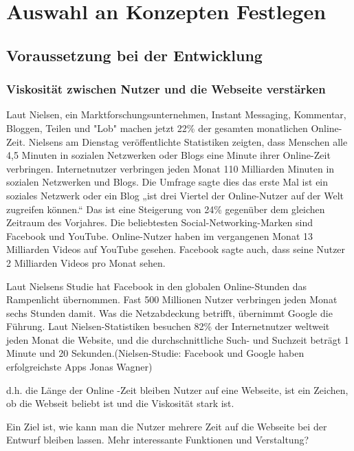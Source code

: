 
\chapter{Auswahl an Konzepten Festlegen}


\section{Voraussetzung bei der Entwicklung}


\subsection{Viskosität zwischen Nutzer und die Webseite verstärken}

Laut Nielsen, ein Marktforschungsunternehmen, Instant Messaging, Kommentar, Bloggen, Teilen und "Lob" machen jetzt 22\% der gesamten monatlichen Online-Zeit. Nielsens am Dienstag veröffentlichte Statistiken zeigten, dass Menschen alle 4,5 Minuten in sozialen Netzwerken oder Blogs eine Minute ihrer Online-Zeit verbringen. Internetnutzer verbringen jeden Monat 110 Milliarden Minuten in sozialen Netzwerken und Blogs. Die Umfrage sagte dies das erste Mal ist ein soziales Netzwerk oder ein Blog „ist drei Viertel der Online-Nutzer auf der Welt zugreifen können.“ Das ist eine Steigerung von 24\% gegenüber dem gleichen Zeitraum des Vorjahres. Die beliebtesten Social-Networking-Marken sind Facebook und YouTube. Online-Nutzer haben im vergangenen Monat 13 Milliarden Videos auf YouTube gesehen. Facebook sagte auch, dass seine Nutzer 2 Milliarden Videos pro Monat sehen.

Laut Nielsens Studie hat Facebook in den globalen Online-Stunden das Rampenlicht übernommen. Fast 500 Millionen Nutzer verbringen jeden Monat sechs Stunden damit.
Was die Netzabdeckung betrifft, übernimmt Google die Führung. Laut Nielsen-Statistiken besuchen 82\% der Internetnutzer weltweit jeden Monat die Website, und die durchschnittliche Such- und Suchzeit beträgt 1 Minute und 20 Sekunden.(Nielsen-Studie: Facebook und Google haben erfolgreichste Apps   Jonas Wagner)

d.h. die Länge der Online -Zeit bleiben Nutzer auf eine Webseite, ist ein Zeichen, ob die Webseit beliebt ist und die  Viskosität stark ist.

Ein Ziel ist, wie kann man die Nutzer mehrere Zeit auf die Webseite bei der Entwurf bleiben lassen.
Mehr interessante Funktionen und Verstaltung?


